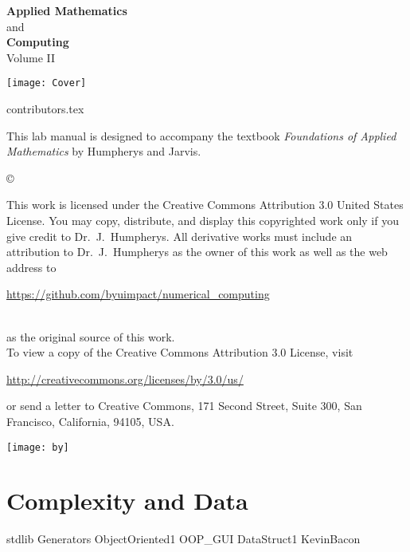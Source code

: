 \documentclass[nociteref]{newsiambook}
\begin{document}
\thispagestyle{empty}
\begin{center}
{\huge \bf Applied Mathematics} \\ and \\ {\huge \bf Computing} \\
\vspace{5mm}
{\Large Volume II}
\vspace{20mm}

\texttt{[image: Cover]}
\end{center}
\frontmatter

{contributors.tex}


\begin{thepreface}
This lab manual is designed to accompany the textbook \emph{Foundations of Applied Mathematics} by Humpherys and Jarvis.

\vfill
\copyright{This work is licensed under the Creative Commons Attribution 3.0 United States
License.  You may copy, distribute, and display this copyrighted work only if you give
credit to Dr.~J.~Humpherys. All derivative works must include an attribution to Dr.~J.~Humpherys as the owner of this work as well as the web address to
\\\centerline{\url{https://github.com/byuimpact/numerical_computing}}\\ as the original source of
this
work.\\To view a copy of the Creative Commons Attribution 3.0 License,
visit\\\centerline{\url{http://creativecommons.org/licenses/by/3.0/us/}} or send a letter to
Creative Commons, 171 Second Street, Suite 300, San Francisco, California, 94105, USA.}

\vfill
\centering\texttt{[image: by]}
\vfill
\end{thepreface}

\setcounter{tocdepth}{1}
\tableofcontents

\mainmatter

\part{Complexity and Data}
{stdlib}
{Generators}
{ObjectOriented1}
{OOP_GUI}
{DataStruct1}
{KevinBacon}
\end{document}
